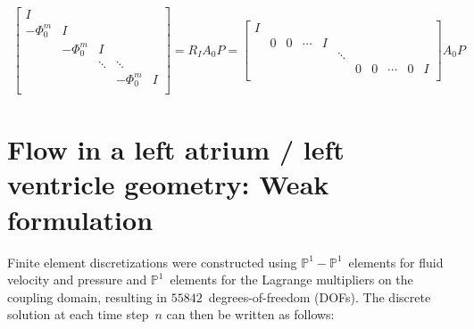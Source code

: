 \documentclass[3p]{elsarticle}
\begin{document}
\begin{align}
\begin{bmatrix}
        I \\
        - \Phi_0^m & I \\
        & - \Phi_0^m & I \\
        && \ddots & \ddots \\
        &&& - \Phi_0^m & I \\
    \end{bmatrix}
    = R_I A_0 P
    = \begin{bmatrix}
        I \\
        & 0 & 0 & \cdots & I \\
        &   &   &        &   & \ddots \\
        &   &   &        &   &        & 0 & 0 & \cdots & 0 & I \\
    \end{bmatrix}
    A_0 P
    \label{RlAlPl-exact-eqn}
\end{align}

\section{Flow in a left atrium / left ventricle geometry: Weak formulation}
\label{lv-flow-application-weak-formulation-suppsec}
Finite element discretizations were constructed using $\mathbb{P}^1 - \mathbb{P}^1$~elements
for fluid velocity and pressure and $\mathbb{P}^1$~elements for the Lagrange multipliers
on the coupling domain,
resulting in $55842$~degrees-of-freedom (DOFs).
The discrete solution at each time step~$n$ can then be written as follows:
\end{document}
